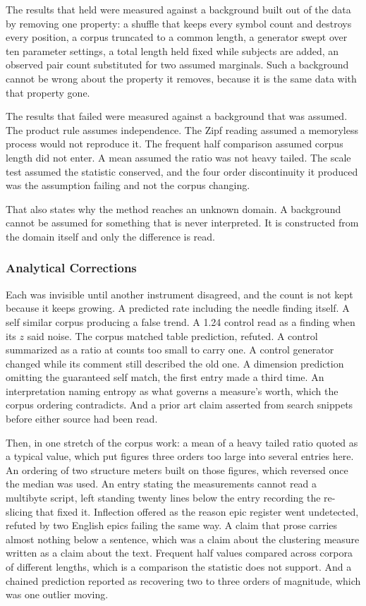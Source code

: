 The results that held were measured against a background built out of the data by removing one property: a shuffle that keeps every symbol count and destroys every position, a corpus truncated to a common length, a generator swept over ten parameter settings, a total length held fixed while subjects are added, an observed pair count substituted for two assumed marginals. Such a background cannot be wrong about the property it removes, because it is the same data with that property gone.

The results that failed were measured against a background that was assumed. The product rule assumes independence. The Zipf reading assumed a memoryless process would not reproduce it. The frequent half comparison assumed corpus length did not enter. A mean assumed the ratio was not heavy tailed. The scale test assumed the statistic conserved, and the four order discontinuity it produced was the assumption failing and not the corpus changing.

That also states why the method reaches an unknown domain. A background cannot be assumed for something that is never interpreted. It is constructed from the domain itself and only the difference is read.

\subsubsection{Analytical Corrections}

Each was invisible until another instrument disagreed, and the count is not kept because it keeps growing. A predicted rate including the needle finding itself. A self similar corpus producing a false trend. A 1.24 control read as a finding when its \(z\) said noise. The corpus matched table prediction, refuted. A control summarized as a ratio at counts too small to carry one. A control generator changed while its comment still described the old one. A dimension prediction omitting the guaranteed self match, the first entry made a third time. An interpretation naming entropy as what governs a measure's worth, which the corpus ordering contradicts. And a prior art claim asserted from search snippets before either source had been read.

Then, in one stretch of the corpus work: a mean of a heavy tailed ratio quoted as a typical value, which put figures three orders too large into several entries here. An ordering of two structure meters built on those figures, which reversed once the median was used. An entry stating the measurements cannot read a multibyte script, left standing twenty lines below the entry recording the re-slicing that fixed it. Inflection offered as the reason epic register went undetected, refuted by two English epics failing the same way. A claim that prose carries almost nothing below a sentence, which was a claim about the clustering measure written as a claim about the text. Frequent half values compared across corpora of different lengths, which is a comparison the statistic does not support. And a chained prediction reported as recovering two to three orders of magnitude, which was one outlier moving.

